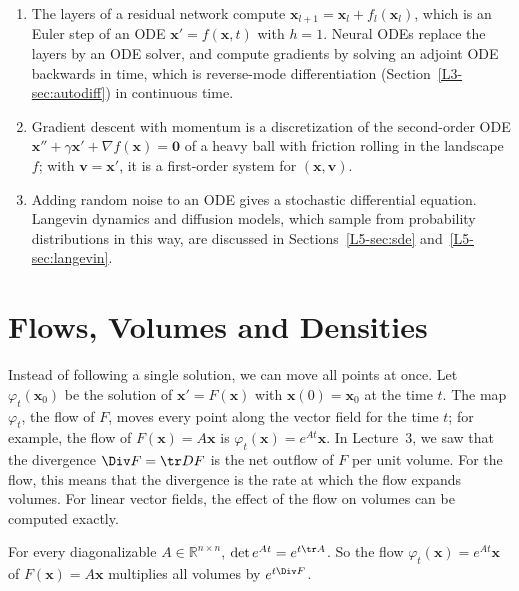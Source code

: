 \begin{remark}
    \begin{enumerate}
        \item The layers of a residual network compute $\mathbf{x}_{l+1} = \mathbf{x}_l + f_l(\mathbf{x}_l)$, which is an Euler step of an ODE $\mathbf{x}' = f(\mathbf{x}, t)$ with $h = 1$. Neural ODEs replace the layers by an ODE solver, and compute gradients by solving an adjoint ODE backwards in time, which is reverse-mode differentiation (Section~\ref{L3-sec:autodiff}) in continuous time.
        \item Gradient descent with momentum is a discretization of the second-order ODE $\mathbf{x}'' + \gamma\mathbf{x}' + \nabla f(\mathbf{x}) = \mathbf{0}$ of a heavy ball with friction rolling in the landscape $f$; with $\mathbf{v} = \mathbf{x}'$, it is a first-order system for $(\mathbf{x}, \mathbf{v})$.
        \item Adding random noise to an ODE gives a stochastic differential equation. Langevin dynamics and diffusion models, which sample from probability distributions in this way, are discussed in Sections~\ref{L5-sec:sde} and~\ref{L5-sec:langevin}.
    \end{enumerate}
\end{remark}

\section{Flows, Volumes and Densities}\label{L5-sec:flows}

Instead of following a single solution, we can move all points at once. Let $\varphi_t(\mathbf{x}_0)$ be the solution of $\mathbf{x}' = F(\mathbf{x})$ with $\mathbf{x}(0) = \mathbf{x}_0$ at the time $t$. The map $\varphi_t$, the flow of $F$, moves every point along the vector field for the time $t$; for example, the flow of $F(\mathbf{x}) = A\mathbf{x}$ is $\varphi_t(\mathbf{x}) = e^{At}\mathbf{x}$. In Lecture~3, we saw that the divergence $\Div F = \tr DF$ is the net outflow of $F$ per unit volume. For the flow, this means that the divergence is the rate at which the flow expands volumes. For linear vector fields, the effect of the flow on volumes can be computed exactly.

\begin{proposition}\label{L5-prop:liouville}
    For every diagonalizable $A \in \mathbb{R}^{n \times n}$, $\det e^{At} = e^{t\tr A}$. So the flow $\varphi_t(\mathbf{x}) = e^{At}\mathbf{x}$ of $F(\mathbf{x}) = A\mathbf{x}$ multiplies all volumes by $e^{t\Div F}$.
\end{proposition}

